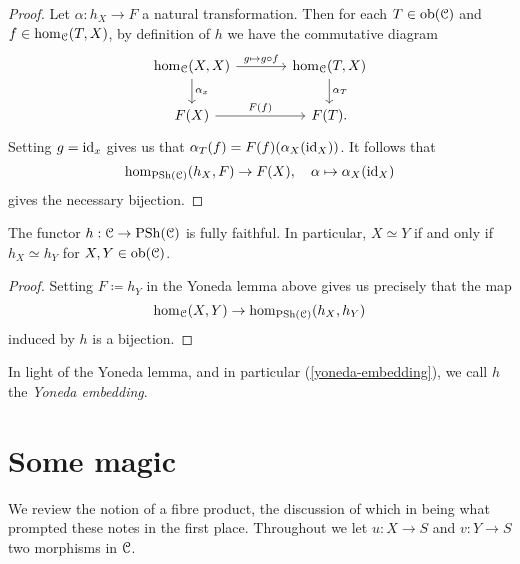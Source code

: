 \begin{proof}
  Let $\alpha : h_X \to F$ a natural transformation. Then for each $T
  \in \operatorname{ob}(\mathcal{C})$ and $f \in \hom_{\mathcal{C}}(T,X)$, by definition of $h$ we have
  the commutative diagram
  \[
  \begin{tikzcd}[column sep = large]
    \hom_\C(X,X) \rar{g \mapsto g \circ f} \dar{\alpha_x} &
    \hom_\C(T,X) \dar{\alpha_T} \\ F(X) \rar{F(f)} & F(T).
  \end{tikzcd}
  \]
  Setting $g = \mathrm{id}_x$
  gives us that $\alpha_T(f) = F(f)(\alpha_X(\mathrm{id}_X))$. It follows that
  \[
  \hom_{\operatorname{PSh}(\mathcal{C})}(h_X, F) \to F(X), \quad \alpha \mapsto
  \alpha_X(\mathrm{id}_X)
  \]
  gives the necessary bijection.
\end{proof}

\begin{corollary}
  \label{yoneda-embedding}
  The functor $h : \mathcal{C} \to \operatorname{PSh}(\mathcal{C})$ is fully faithful. In particular, $X
  \simeq Y$ if and only if $h_X \simeq h_Y$ for $X,Y \in \operatorname{ob}(\mathcal{C})$.
\end{corollary}

\begin{proof}
  Setting $F \coloneqq h_Y$ in the Yoneda lemma above gives us
  precisely that the map
  \[
  \hom_{\mathcal{C}}(X,Y) \to \hom_{\operatorname{PSh}(\mathcal{C})}(h_X,h_Y)
  \]
  induced by $h$ is a bijection.
\end{proof}

\begin{remark}
  In light of the Yoneda lemma, and in particular
  (\ref{yoneda-embedding}), we call $h$ the \textit{Yoneda embedding}.
\end{remark}


\section{Some magic}

We review the notion of a fibre product, the discussion of which in
\cite{gortzwedhorn} being what prompted these notes in the first
place. Throughout we let $u : X \to S$ and $v : Y \to S$ two morphisms
in $\mathcal{C}$.

